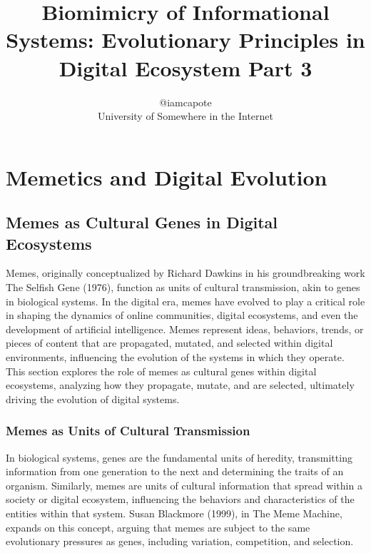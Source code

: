 \documentclass[12pt,twoside]{article}
\begin{document}
\onecolumn
\title{Biomimicry of Informational Systems: Evolutionary Principles in Digital Ecosystem Part 3}
\author{@iamcapote \\ \small University of Somewhere in the Internet}
\date{\vspace{-5ex}} %
\maketitle
\tableofcontents
\newpage


\section{Memetics and Digital Evolution}

\subsection{Memes as Cultural Genes in Digital Ecosystems}

Memes, originally conceptualized by Richard Dawkins in his groundbreaking work The Selfish Gene (1976), function as units of cultural transmission, akin to genes in biological systems. In the digital era, memes have evolved to play a critical role in shaping the dynamics of online communities, digital ecosystems, and even the development of artificial intelligence. Memes represent ideas, behaviors, trends, or pieces of content that are propagated, mutated, and selected within digital environments, influencing the evolution of the systems in which they operate. This section explores the role of memes as cultural genes within digital ecosystems, analyzing how they propagate, mutate, and are selected, ultimately driving the evolution of digital systems.

\subsubsection{Memes as Units of Cultural Transmission}

In biological systems, genes are the fundamental units of heredity, transmitting information from one generation to the next and determining the traits of an organism. Similarly, memes are units of cultural information that spread within a society or digital ecosystem, influencing the behaviors and characteristics of the entities within that system. Susan Blackmore (1999), in The Meme Machine, expands on this concept, arguing that memes are subject to the same evolutionary pressures as genes, including variation, competition, and selection.
\end{document}
